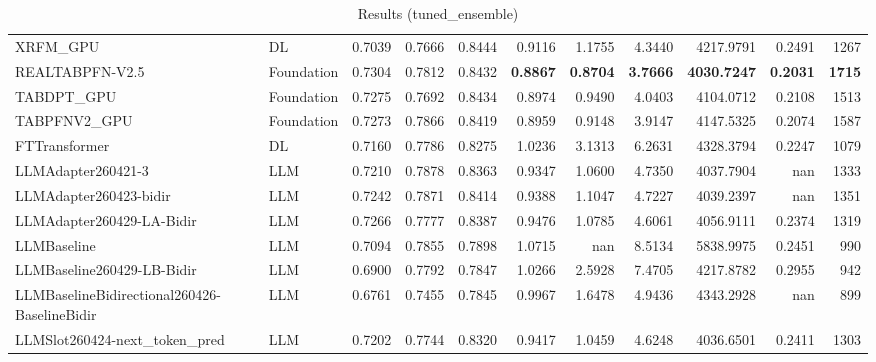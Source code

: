 \begin{table}[htbp]
{\begin{tabular}{ll|rrrrrrrr|r}
XRFM\_GPU & DL & 0.7039 & 0.7666 & 0.8444 & 0.9116 & 1.1755 & 4.3440 & 4217.9791 & 0.2491 & 1267 \\
REALTABPFN-V2.5 & Foundation & 0.7304 & 0.7812 & 0.8432 & \textbf{0.8867} & \textbf{0.8704} & \textbf{3.7666} & \textbf{4030.7247} & \textbf{0.2031} & \textbf{1715} \\
TABDPT\_GPU & Foundation & 0.7275 & 0.7692 & 0.8434 & 0.8974 & 0.9490 & 4.0403 & 4104.0712 & 0.2108 & 1513 \\
TABPFNV2\_GPU & Foundation & 0.7273 & 0.7866 & 0.8419 & 0.8959 & 0.9148 & 3.9147 & 4147.5325 & 0.2074 & 1587 \\
\midrule
FTTransformer & DL & 0.7160 & 0.7786 & 0.8275 & 1.0236 & 3.1313 & 6.2631 & 4328.3794 & 0.2247 & 1079 \\
LLMAdapter260421-3 & LLM & 0.7210 & 0.7878 & 0.8363 & 0.9347 & 1.0600 & 4.7350 & 4037.7904 & nan & 1333 \\
LLMAdapter260423-bidir & LLM & 0.7242 & 0.7871 & 0.8414 & 0.9388 & 1.1047 & 4.7227 & 4039.2397 & nan & 1351 \\
LLMAdapter260429-LA-Bidir & LLM & 0.7266 & 0.7777 & 0.8387 & 0.9476 & 1.0785 & 4.6061 & 4056.9111 & 0.2374 & 1319 \\
LLMBaseline & LLM & 0.7094 & 0.7855 & 0.7898 & 1.0715 & nan & 8.5134 & 5838.9975 & 0.2451 & 990 \\
LLMBaseline260429-LB-Bidir & LLM & 0.6900 & 0.7792 & 0.7847 & 1.0266 & 2.5928 & 7.4705 & 4217.8782 & 0.2955 & 942 \\
LLMBaselineBidirectional260426-BaselineBidir & LLM & 0.6761 & 0.7455 & 0.7845 & 0.9967 & 1.6478 & 4.9436 & 4343.2928 & nan & 899 \\
LLMSlot260424-next\_token\_pred & LLM & 0.7202 & 0.7744 & 0.8320 & 0.9417 & 1.0459 & 4.6248 & 4036.6501 & 0.2411 & 1303 \\
\bottomrule
\end{tabular}
}
\caption{Results (tuned_ensemble)}
\label{tab:results_tuned_ensemble}
\end{table}